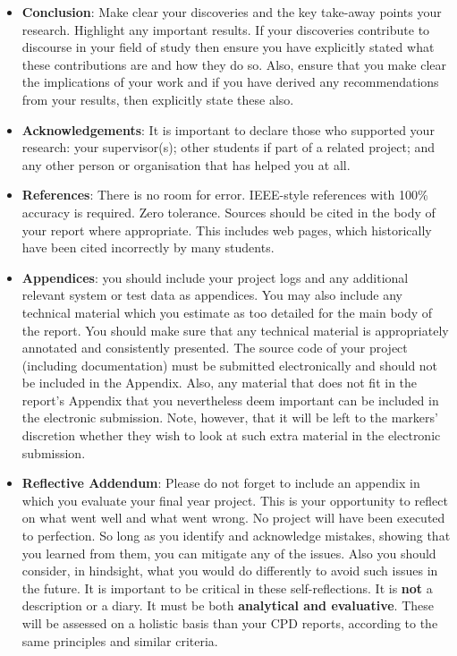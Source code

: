 \documentclass{../fal_assignment}
\begin{document}
\begin{itemize}
\item \textbf{Conclusion}: Make clear your discoveries and the key take-away points your research. Highlight any important results. If your discoveries contribute to discourse in your field of study then ensure you have explicitly stated what these contributions are and how they do so. Also, ensure that you make clear the implications of your work and if you have derived any recommendations from your results, then explicitly state these also. 

\item \textbf{Acknowledgements}: It is important to declare those who supported your research: your supervisor(s); other students if part of a related project; and any other person or organisation that has helped you at all.

\item \textbf{References}: There is no room for error. IEEE-style references with 100\% accuracy is required. Zero tolerance. Sources should be cited in the body of your report where appropriate. This includes web pages, which historically have been cited incorrectly by many students.

\item \textbf{Appendices}: you should include your project logs and any additional relevant system or test data as appendices. You may also include any technical material which you estimate as too detailed for the main body of the report. You should make sure that any technical material is appropriately annotated and consistently presented. The source code of your project (including documentation) must be submitted electronically and should not be included in the Appendix. Also, any material that does not fit in the report's Appendix that you nevertheless deem important can be included in the electronic submission. Note, however, that it will be left to the markers' discretion whether they wish to look at such extra material in the electronic submission.

\item \textbf{Reflective Addendum}: Please do not forget to include an appendix in which you evaluate your final year project. This is your opportunity to reflect on what went well and what went wrong. No project will have been executed to perfection. So long as you identify and acknowledge mistakes, showing that you learned from them, you can mitigate any of the issues. Also you should consider, in hindsight, what you would do differently to avoid such issues in the future. It is important to be critical in these self-reflections. It is \textbf{not} a description or a diary. It must be both \textbf{analytical and evaluative}. These will be assessed on a holistic basis than your CPD reports, according to the same principles and similar criteria. 

\end{itemize}
\end{document}
